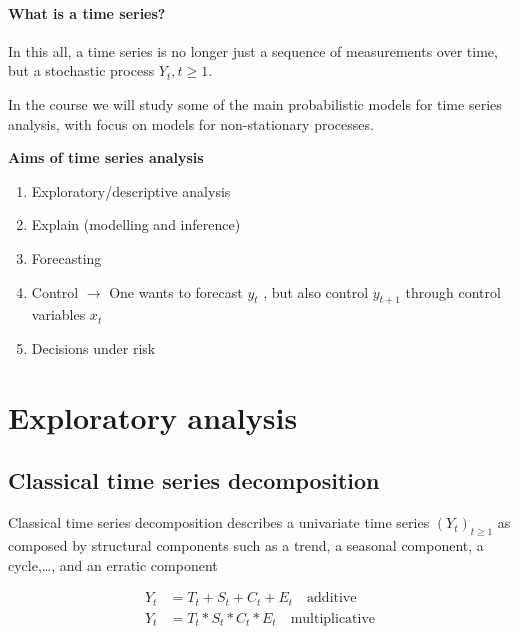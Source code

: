\documentclass[dvipsnames,12pt]{book}
\begin{document}
                \paragraph{What is a time series?}
    
                    In this all, a time series is no longer just a sequence of measurements over time, but a stochastic process \(Y_t, t \geq 1\).
    
                    In the course we will study some of the main probabilistic models for time series analysis, with focus on models for non-stationary processes.

\newpage

                \begin{remark}
                    \textbf{Aims of time series analysis}
                    \begin{enumerate}
                        \item Exploratory/descriptive analysis
                        \item Explain (modelling and inference)
                        \item Forecasting
                        \item Control \(\rightarrow\) One wants to forecast \(y_t\) , but also control \(y_{t+1}\) through control variables \(x_t\)
                        \item Decisions under risk
                    \end{enumerate}
                \end{remark}


        \section{Exploratory analysis}

            \subsection{Classical time series decomposition}
            
                Classical time series decomposition describes a univariate time series \( (Y_t)_{t \geq 1} \) as composed by structural components such as a trend, a seasonal component, a cycle,\dots, and an erratic component
                
                \begin{align}
                    Y_t & = T_t + S_t + C_t + E_t \quad \text{additive} \label{1.4eq} \\
                    Y_t & = T_t * S_t * C_t * E_t \quad \text{multiplicative} \label{1.5eq}
                \end{align}
                
\end{document}
